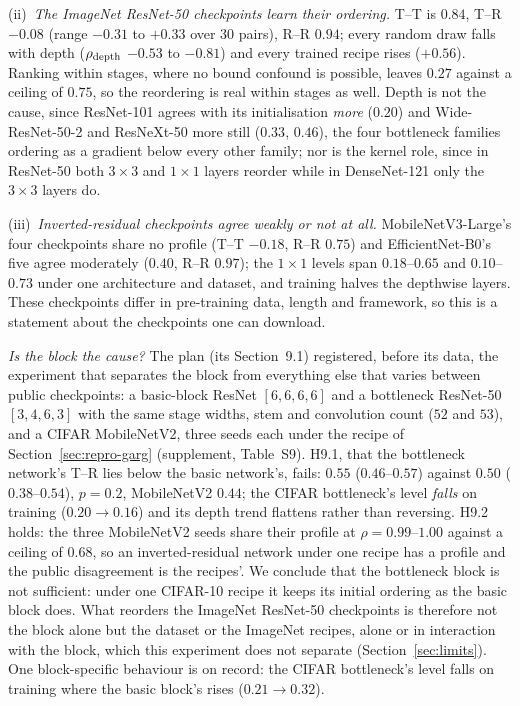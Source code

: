 \documentclass[10pt,journal,compsoc]{IEEEtran}
\begin{document}
(ii)~\emph{The ImageNet ResNet-50 checkpoints learn their ordering.} T--T
is $0.84$, T--R $-0.08$ (range $-0.31$ to $+0.33$ over 30 pairs), R--R
$0.94$; every random draw falls with depth ($\rho_{\rm depth}$ $-0.53$ to
$-0.81$) and every trained recipe rises ($+0.56$). Ranking within stages,
where no bound confound is possible, leaves $0.27$ against a ceiling of
$0.75$, so the reordering is real within stages as well. Depth is not the
cause, since ResNet-101 agrees with its initialisation \emph{more}
($0.20$) and Wide-ResNet-50-2 and ResNeXt-50 more still ($0.33$, $0.46$),
the four bottleneck families ordering as a gradient below every other
family; nor is the kernel role, since in ResNet-50 both $3\!\times\!3$ and
$1\!\times\!1$ layers reorder while in DenseNet-121 only the
$3\!\times\!3$ layers do.

(iii)~\emph{Inverted-residual checkpoints agree weakly or not at all.}
MobileNetV3-Large's four checkpoints share no profile (T--T $-0.18$, R--R
$0.75$) and EfficientNet-B0's five agree moderately ($0.40$, R--R $0.97$);
the $1\!\times\!1$ levels span $0.18$--$0.65$ and $0.10$--$0.73$ under one
architecture and dataset, and training halves the depthwise layers. These
checkpoints differ in pre-training data, length and framework, so this is
a statement about the checkpoints one can download.

\emph{Is the block the cause?} The plan (its Section~9.1) registered, before
its data, the experiment that separates the block from everything else
that varies between public checkpoints: a basic-block ResNet $[6,6,6,6]$
and a bottleneck ResNet-50 $[3,4,6,3]$ with the same stage widths, stem
and convolution count ($52$ and $53$), and a CIFAR MobileNetV2, three
seeds each under the recipe of Section~\ref{sec:repro-garg} (supplement,
Table~S9). H9.1, that the bottleneck network's T--R lies below the basic
network's, fails: $0.55$ ($0.46$--$0.57$) against $0.50$ ($0.38$--$0.54$),
$p = 0.2$, MobileNetV2 $0.44$; the CIFAR bottleneck's level \emph{falls}
on training ($0.20 \to 0.16$) and its depth trend flattens rather than
reversing. H9.2 holds: the three MobileNetV2 seeds share their profile at
$\rho = 0.99$--$1.00$ against a ceiling of $0.68$, so an inverted-residual
network under one recipe has a profile and the public disagreement is the
recipes'. We conclude that the bottleneck block is not sufficient: under
one CIFAR-10 recipe it keeps its initial ordering as the basic block does.
What reorders the ImageNet ResNet-50 checkpoints is therefore not the
block alone but the dataset or the ImageNet recipes, alone or in
interaction with the block, which this experiment does not separate
(Section~\ref{sec:limits}). One block-specific behaviour is on record:
the CIFAR bottleneck's level falls on training where the basic block's
rises ($0.21 \to 0.32$).
\end{document}
